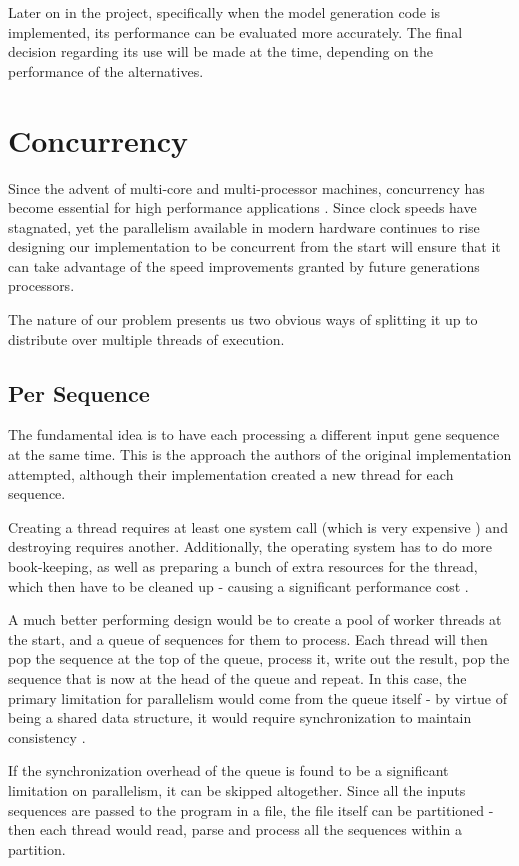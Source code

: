 Later on in the project, specifically when the model generation code is implemented, its performance can be evaluated more accurately. The final decision regarding its use will be made at the time, depending on the performance of the alternatives.

\section{Concurrency}
Since the advent of multi-core and multi-processor machines, concurrency has become essential for high performance applications \autocite{freelunch}. Since clock speeds have stagnated, yet the parallelism available in modern hardware continues to rise designing our implementation to be concurrent from the start will ensure that it can take advantage of the speed improvements granted by future generations processors.

The nature of our problem presents us two obvious ways of splitting it up to distribute over multiple threads of execution.

\subsection{Per Sequence}
 The fundamental idea is to have each processing a different input gene sequence at the same time. This is the approach the authors of the original implementation attempted, although their implementation created a new thread for each sequence.

 Creating a thread requires at least one system call (which is very expensive \autocite{syscalls}) and destroying requires another. Additionally, the operating system has to do more book-keeping, as well as preparing a bunch of extra resources for the thread, which then have to be cleaned up - causing a significant performance cost \autocite{threads}.

 A much better performing design would be to create a pool of worker threads at the start, and a queue of sequences for them to process. Each thread will then pop the sequence at the top of the queue, process it, write out the result, pop the sequence that is now at the head of the queue and repeat. In this case, the primary limitation for parallelism would come from the queue itself - by virtue of being a shared data structure, it would require synchronization to maintain consistency \autocite{concurrency}.

 If the synchronization overhead of the queue is found to be a significant limitation on parallelism, it can be skipped altogether. Since all the inputs sequences are passed to the program in a file, the file itself can be partitioned - then each thread would read, parse and process all the sequences within a partition.

